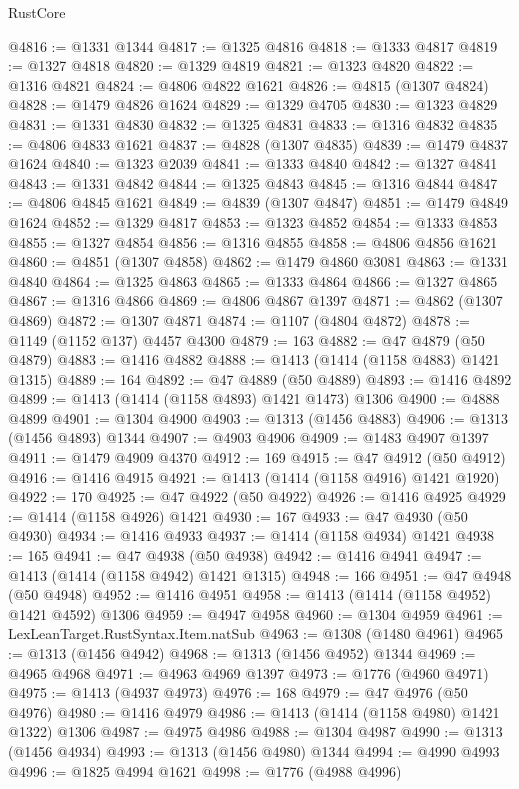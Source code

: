 \begin{lexlean}{RustCore}
\begin{coremodule}
@4816 := @1331 @1344
@4817 := @1325 @4816
@4818 := @1333 @4817
@4819 := @1327 @4818
@4820 := @1329 @4819
@4821 := @1323 @4820
@4822 := @1316 @4821
@4824 := @4806 @4822 @1621
@4826 := @4815 (@1307 @4824)
@4828 := @1479 @4826 @1624
@4829 := @1329 @4705
@4830 := @1323 @4829
@4831 := @1331 @4830
@4832 := @1325 @4831
@4833 := @1316 @4832
@4835 := @4806 @4833 @1621
@4837 := @4828 (@1307 @4835)
@4839 := @1479 @4837 @1624
@4840 := @1323 @2039
@4841 := @1333 @4840
@4842 := @1327 @4841
@4843 := @1331 @4842
@4844 := @1325 @4843
@4845 := @1316 @4844
@4847 := @4806 @4845 @1621
@4849 := @4839 (@1307 @4847)
@4851 := @1479 @4849 @1624
@4852 := @1329 @4817
@4853 := @1323 @4852
@4854 := @1333 @4853
@4855 := @1327 @4854
@4856 := @1316 @4855
@4858 := @4806 @4856 @1621
@4860 := @4851 (@1307 @4858)
@4862 := @1479 @4860 @3081
@4863 := @1331 @4840
@4864 := @1325 @4863
@4865 := @1333 @4864
@4866 := @1327 @4865
@4867 := @1316 @4866
@4869 := @4806 @4867 @1397
@4871 := @4862 (@1307 @4869)
@4872 := @1307 @4871
@4874 := @1107 (@4804 @4872)
@4878 := @1149 (@1152 @137) @4457 @4300
@4879 := 163
@4882 := @47 @4879 (@50 @4879)
@4883 := @1416 @4882
@4888 := @1413 (@1414 (@1158 @4883) @1421 @1315)
@4889 := 164
@4892 := @47 @4889 (@50 @4889)
@4893 := @1416 @4892
@4899 := @1413 (@1414 (@1158 @4893) @1421 @1473) @1306
@4900 := @4888 @4899
@4901 := @1304 @4900
@4903 := @1313 (@1456 @4883)
@4906 := @1313 (@1456 @4893) @1344
@4907 := @4903 @4906
@4909 := @1483 @4907 @1397
@4911 := @1479 @4909 @4370
@4912 := 169
@4915 := @47 @4912 (@50 @4912)
@4916 := @1416 @4915
@4921 := @1413 (@1414 (@1158 @4916) @1421 @1920)
@4922 := 170
@4925 := @47 @4922 (@50 @4922)
@4926 := @1416 @4925
@4929 := @1414 (@1158 @4926) @1421
@4930 := 167
@4933 := @47 @4930 (@50 @4930)
@4934 := @1416 @4933
@4937 := @1414 (@1158 @4934) @1421
@4938 := 165
@4941 := @47 @4938 (@50 @4938)
@4942 := @1416 @4941
@4947 := @1413 (@1414 (@1158 @4942) @1421 @1315)
@4948 := 166
@4951 := @47 @4948 (@50 @4948)
@4952 := @1416 @4951
@4958 := @1413 (@1414 (@1158 @4952) @1421 @4592) @1306
@4959 := @4947 @4958
@4960 := @1304 @4959
@4961 := LexLeanTarget.RustSyntax.Item.natSub
@4963 := @1308 (@1480 @4961)
@4965 := @1313 (@1456 @4942)
@4968 := @1313 (@1456 @4952) @1344
@4969 := @4965 @4968
@4971 := @4963 @4969 @1397
@4973 := @1776 (@4960 @4971)
@4975 := @1413 (@4937 @4973)
@4976 := 168
@4979 := @47 @4976 (@50 @4976)
@4980 := @1416 @4979
@4986 := @1413 (@1414 (@1158 @4980) @1421 @1322) @1306
@4987 := @4975 @4986
@4988 := @1304 @4987
@4990 := @1313 (@1456 @4934)
@4993 := @1313 (@1456 @4980) @1344
@4994 := @4990 @4993
@4996 := @1825 @4994 @1621
@4998 := @1776 (@4988 @4996)

\end{coremodule}
\end{lexlean}
